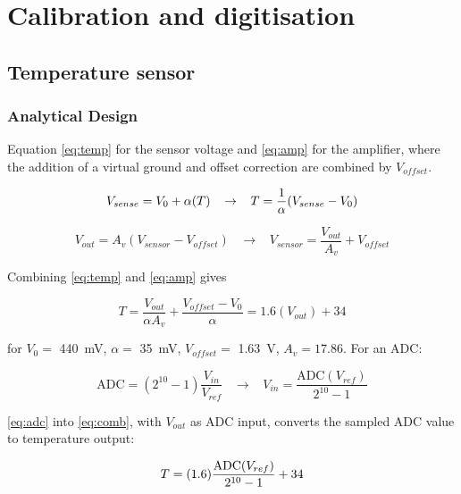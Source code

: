 \chapter{Calibration and digitisation}\label{ch:ADC}

\section{Temperature sensor} \label{sec:ADCTemp}

	\subsection{Analytical Design} \label{sec:ADCTempAna}

Equation \ref{eq:temp} for the sensor voltage and \ref{eq:amp} for the amplifier, where the addition of a virtual ground and offset correction are combined by $V_{offset}$.

\begin{equation}
\vspace{-0.4cm}
\label{eq:temp}
V_{sense} = V_{0} + \alpha(T) \;\;\; \rightarrow \;\;\; T = \frac{1}{\alpha}(V_{sense} - V_{0})
\end{equation}

\begin{equation}
\label{eq:amp}
V_{out}=A_{v}\left({V}_{sensor}-{V}_{offset}\right) \;\;\; \rightarrow \;\;\; {V}_{sensor} = \frac{V_{out}}{A_{v}} + V_{offset}
\end{equation}

Combining \ref{eq:temp} and \ref{eq:amp} gives

\begin{equation}
\label{eq:comb}
T = \frac{V_{out}}{\alpha A_{v}} + \frac{V_{offset} - V_{0}}{\alpha} = 1.6(V_{out}) + 34
\end{equation}

for $V_{0} =$ \SI{440}{mV}, $\alpha =$ \SI{35}{mV}, $V_{offset} =$ \SI{1.63}{V}, $A_{v} = 17.86$. For an ADC:

\begin{equation}
\label{eq:adc}
\mathrm{ADC} = (2^{10}-1)\frac{V_{in}}{V_{ref}} \;\;\; \rightarrow \;\;\; V_{in} = \frac{\mathrm{ADC}(V_{ref})}{2^{10}-1}
\end{equation}

\ref{eq:adc} into \ref{eq:comb}, with $V_{out}$ as ADC input, converts the sampled ADC value to temperature output: 

\begin{equation}
\vspace{-0.4cm}
\label{eq:adctemp}
T = (1.6)\frac{\mathrm{ADC}(V_{ref})}{2^{10}-1} + 34
\end{equation}



